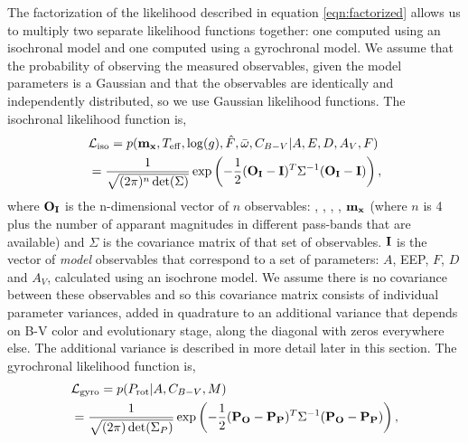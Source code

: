 The factorization of the likelihood described in equation \ref{eqn:factorized}
allows us to multiply two separate likelihood functions together: one computed
using an isochronal model and one computed using a gyrochronal model.
We assume that the probability of observing the measured observables, given
the model parameters is a Gaussian and that the observables are identically
and independently distributed, so we use Gaussian likelihood functions.
The isochronal likelihood function is,
\begin{eqnarray} \label{eqn:isochrones_only_likelihood}
    & \mathcal{L_{\mathrm{iso}}} = p({\bf m_x}, T_{\mathrm{eff}}, \log(g),
    \hat{F},
    \bar{\omega}, C_{B-V}|A, E, D,
    A_V, F) \\ \nonumber
    & = \frac{1}{\sqrt{(2\pi)^n \det(\Sigma)}}
    \exp\left( -\frac{1}{2} ({\bf O_I} - {\bf I})^T \Sigma ^{-1}
    ({\bf O_I} - {\bf I})\right),
\end{eqnarray}
where ${\bf O_I}$ is the n-dimensional vector of $n$ observables: \teff,
\logg, \fhat, \pmega, ${\bf m_x}$ (where $n$ is 4 plus the number of
apparant magnitudes in different pass-bands that are available) and $\Sigma$
is the covariance matrix of that set of observables.
${\bf I}$ is the vector of {\it model} observables that correspond to a set of
parameters: $A$, EEP, $F$, $D$ and $A_V$, calculated using an isochrone model.
We assume there is no covariance between these observables and so this
covariance matrix consists of individual parameter variances, added in
quadrature to an additional variance that depends on B-V color and
evolutionary stage, along the diagonal with zeros everywhere else.
The additional variance is described in more detail later in this section.
The gyrochronal likelihood function is,
\begin{eqnarray} \label{eqn:gyro_likelihood}
    & \mathcal{L_{\mathrm{gyro}}} = p(P_\mathrm{rot} |A, C_{B-V}, M) \\ \nonumber
    & = \frac{1}{\sqrt{(2\pi) \det(\Sigma_P)}}
    \exp\left( -\frac{1}{2} ({\bf P_O} - {\bf P_P})^T \Sigma ^{-1}
    ({\bf P_O} - {\bf P_P})\right),
\end{eqnarray}
